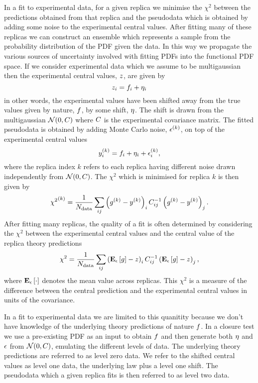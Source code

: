 In a fit to experimental data, for a given replica we minimise the $\chi^2$
between the predictions obtained from that replica and the pseudodata which is
obtained by adding some noise to the experimental central values. After fitting
many of these replicas we can construct an ensemble which represents a sample
from the probability distribution of the PDF given the data. In this
way we propagate the various sources of uncertainty involved with fitting PDFs
into the functional PDF space. If we consider experimental data which we assume
to be multigaussian then the experimental central values, $z$, are given by
\begin{equation}
    z_{i} = f_i + \eta_i
\end{equation}
in other words, the experimental values have been shifted away from the true
values given by nature, $f$, by some shift, $\eta$. The shift is drawn from
the multigaussian $\mathcal{N}(0, C)$ where $C$ is the experimental covariance
matrix. The fitted pseudodata is obtained by adding Monte Carlo noise, $\epsilon^{(k)}$,
on top of the experimental central values
\begin{equation}
    y^{(k)}_{i} = f_i + \eta_i + \epsilon^{(k)}_{i},
\end{equation}
where the replica index $k$ refers to each replica having different noise drawn
independently from $\mathcal{N}(0, C)$. The $\chi^2$ which is minimised for
replica $k$ is then given by
\begin{equation}
    {\chi^2}^{(k)} = \frac{1}{N_{\rm data}} \sum_{ij} \left( g^{(k)} - y^{(k)} \right)_i C^{-1}_{ij} \left( g^{(k)} - y^{(k)} \right)_j.
\end{equation}
After fitting many replicas, the quality of a fit is often determined by
considering the $\chi^2$ between the experimental central values and the
central value of the replica theory predictions
\begin{equation}
    \chi^2 = \frac{1}{N_{\rm data}} \sum_{ij} \left( \mathbf{E}_{\epsilon}\left[ g \right] - z \right)_i C^{-1}_{ij} \left( \mathbf{E}_{\epsilon}\left[ g \right] - z \right)_j,
\end{equation}
where $\mathbf{E}_{\epsilon}\left[ \cdot \right]$ denotes the mean value across replicas. This $\chi^2$ is a
measure of the difference between the central prediction and the experimental
central values in units of the covariance.

In a fit to
experimental data we are limited to this quanitity because we don't have knowledge
of the underlying theory predictions of nature $f$. In a closure test we use
a pre-existing PDF as an input to obtain $f$ and then generate both
$\eta$ and $\epsilon$ from $\mathcal{N}(0, C)$, emulating the different levels
of data. The underlying theory predictions are referred to as level zero data.
We refer to the shifted central values as level one data, the underlying
law plus a level one shift. The pseudodata which a given replica fits is then
referred to as level two data.
